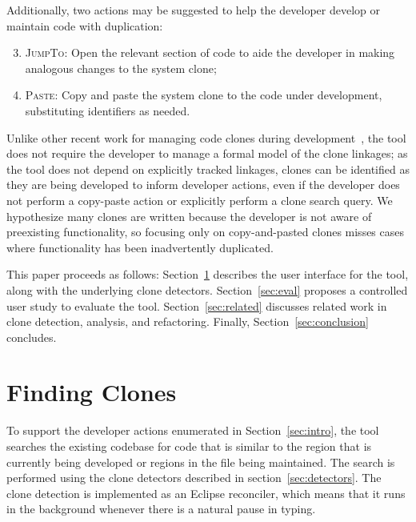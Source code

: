 \documentclass[nocopyrightspace,10pt]{sigplanconf}
\begin{document}
\noindent Additionally, two actions may be suggested to help the developer
develop or maintain code with duplication:

\begin{enumerate}
\setcounter{enumi}{2}
  \item \textsc{JumpTo}: Open the relevant section of code to aide the
    developer in making analogous changes to the system clone;
  \item \textsc{Paste}: Copy and paste the system clone to the code under development,
    substituting identifiers as needed.
\end{enumerate}

Unlike other recent work for managing code clones during
development~\cite{deWit2009, Duala-Ekoko2007}, the tool does not
require the developer to manage a formal model of the clone linkages;
as the tool does not depend on explicitly tracked linkages, clones can
be identified as they are being developed to inform developer actions,
even if the developer does not perform a copy-paste action or
explicitly perform a clone search query.  We hypothesize many clones 
are written because the developer is not aware of preexisting functionality,
 so focusing only on copy-and-pasted clones
misses cases where functionality has been inadvertently 
duplicated.

This paper proceeds as follows: Section~\ref{sec:finding-clones}
describes the user interface for the tool, along with the underlying
clone detectors. Section~\ref{sec:eval} proposes a controlled user
study to evaluate the tool. Section~\ref{sec:related} discusses
related work in clone detection, analysis, and refactoring. Finally,
Section~\ref{sec:conclusion} concludes.

\section{Finding Clones}
\label{sec:finding-clones}



To support the developer actions enumerated in Section~\ref{sec:intro},
the tool searches the existing codebase for code
that is similar to the region that is currently being developed or regions
in the file being maintained. The search is performed using the clone detectors
described in section~\ref{sec:detectors}. The clone detection is implemented as
an Eclipse reconciler, which means that it runs in the background whenever there
is a natural pause in typing.
\end{document}
